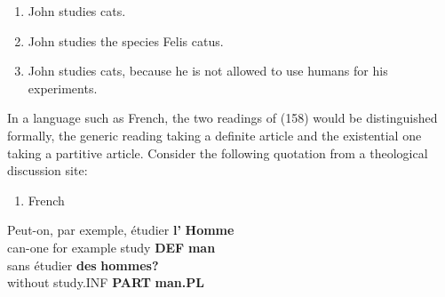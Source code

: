 \begin{enumerate} %
\item 
\label{bkm:Ref107049066}John studies cats.

\item 
\label{bkm:Ref107049087}John studies the species Felis catus.

\item 
\label{bkm:Ref107049114}John studies cats, because he is not allowed to use humans for his experiments. 

\end{enumerate} %
In a language such as French, the two readings of (158) would be distinguished formally, the generic reading taking a definite article and the existential one taking a partitive article. Consider the following quotation from a theological discussion site:

\begin{enumerate} %
\item 
French

\end{enumerate} %
\ea\label{}
\gll Peut-on,  par  exemple,  étudier  \textbf{l’} \textbf{ Homme}\\


can-one  for  example  study  \textbf{DEF } \textbf{man}\\ %


\ea\label{}
\gll sans  étudier  \textbf{des} \textbf{hommes?} \\


without  study.INF  \textbf{PART} \textbf{man.PL} \\ %


